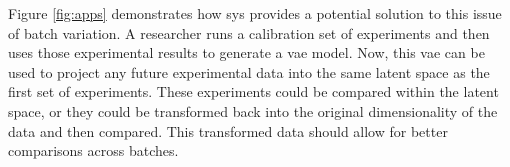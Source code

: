 Figure \ref{fig:apps} demonstrates how \gls{sys} provides a potential solution to this issue of batch variation.
A researcher runs a calibration set of experiments and then uses those experimental results to generate a \gls{vae} model.
Now, this \gls{vae} can be used to project any future experimental data into the same latent space as the first set of experiments.
These experiments could be compared within the latent space, or they could be transformed back into the original dimensionality of the data and then compared.
This transformed data should allow for better comparisons across batches.

